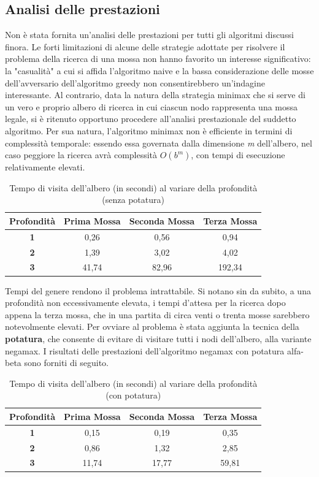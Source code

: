 \subsection{Analisi delle prestazioni}
\label{cap: Analisi}
Non è stata fornita un'analisi delle prestazioni per tutti gli algoritmi discussi finora. Le forti limitazioni di alcune delle strategie adottate per risolvere il problema della ricerca di una mossa non hanno favorito un interesse significativo: la "casualità" a cui si affida l'algoritmo naive e la bassa considerazione delle mosse dell'avversario dell'algoritmo greedy non consentirebbero un'indagine interessante. Al contrario, data la natura della strategia minimax che si serve di un vero e proprio albero di ricerca in cui ciascun nodo rappresenta una mossa legale, si è ritenuto opportuno procedere all'analisi prestazionale del suddetto algoritmo. Per sua natura, l'algoritmo minimax non è efficiente in termini di complessità temporale: essendo essa governata dalla dimensione \textit{m} dell'albero, nel caso peggiore la ricerca avrà complessità $O(b^m)$, con tempi di esecuzione relativamente elevati.\newpage

\begin{table}[!htb]
    \centering
    \begin{tabular}{|c|c|c|c|}
\hline
\textbf{Profondità} & \textbf{Prima Mossa} & \textbf{Seconda Mossa} & \textbf{Terza Mossa}\\
\hline
\textbf{1} & 0,26 & 0,56 & 0,94\\
\hline
\textbf{2} & 1,39 & 3,02 & 4,02\\
\hline
\textbf{3} & 41,74 & 82,96 & 192,34\\
\hline
\end{tabular}
    \caption{Tempo di visita dell'albero (in secondi) al variare della profondità (senza potatura)}
    \label{tab:my_label}
\end{table}

Tempi del genere rendono il problema intrattabile. Si notano sin da subito, a una profondità non eccessivamente elevata, i tempi d'attesa per la ricerca dopo appena la terza mossa, che in una partita di circa venti o trenta mosse sarebbero notevolmente elevati. Per ovviare al problema è stata aggiunta la tecnica della \textbf{potatura}, che consente di evitare di visitare tutti i nodi dell'albero, alla variante negamax. I risultati delle prestazioni dell'algoritmo negamax con potatura alfa-beta sono forniti di seguito.

\begin{table}[!htb]
    \centering
    \begin{tabular}{|c|c|c|c|}
\hline
\textbf{Profondità} & \textbf{Prima Mossa} & \textbf{Seconda Mossa} & \textbf{Terza Mossa}\\
\hline
\textbf{1} & 0,15 & 0,19 & 0,35\\
\hline
\textbf{2} & 0,86 & 1,32 & 2,85\\
\hline
\textbf{3} & 11,74 & 17,77 & 59,81\\
\hline
\end{tabular}
    \caption{Tempo di visita dell'albero (in secondi) al variare della profondità (con potatura)}
    \label{tab:my_label}
\end{table}

